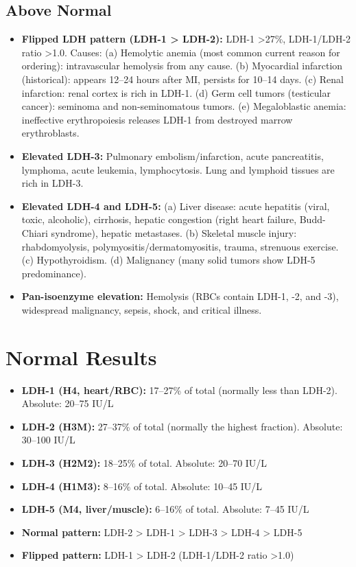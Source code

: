 \subsection*{Above Normal}
\begin{itemize}
  \item \textbf{Flipped LDH pattern (LDH-1 > LDH-2):} LDH-1 >27\%, LDH-1/LDH-2 ratio >1.0. Causes: (a) Hemolytic anemia (most common current reason for ordering): intravascular hemolysis from any cause. (b) Myocardial infarction (historical): appears 12--24 hours after MI, persists for 10--14 days. (c) Renal infarction: renal cortex is rich in LDH-1. (d) Germ cell tumors (testicular cancer): seminoma and non-seminomatous tumors. (e) Megaloblastic anemia: ineffective erythropoiesis releases LDH-1 from destroyed marrow erythroblasts.
  \item \textbf{Elevated LDH-3:} Pulmonary embolism/infarction, acute pancreatitis, lymphoma, acute leukemia, lymphocytosis. Lung and lymphoid tissues are rich in LDH-3.
  \item \textbf{Elevated LDH-4 and LDH-5:} (a) Liver disease: acute hepatitis (viral, toxic, alcoholic), cirrhosis, hepatic congestion (right heart failure, Budd-Chiari syndrome), hepatic metastases. (b) Skeletal muscle injury: rhabdomyolysis, polymyositis/dermatomyositis, trauma, strenuous exercise. (c) Hypothyroidism. (d) Malignancy (many solid tumors show LDH-5 predominance).
  \item \textbf{Pan-isoenzyme elevation:} Hemolysis (RBCs contain LDH-1, -2, and -3), widespread malignancy, sepsis, shock, and critical illness.
\end{itemize}

\section*{Normal Results}
\begin{itemize}
  \item \textbf{LDH-1 (H4, heart/RBC):} 17--27\% of total (normally less than LDH-2). Absolute: 20--75 IU/L \cite{wallach2022interpretation}
  \item \textbf{LDH-2 (H3M):} 27--37\% of total (normally the highest fraction). Absolute: 30--100 IU/L
  \item \textbf{LDH-3 (H2M2):} 18--25\% of total. Absolute: 20--70 IU/L
  \item \textbf{LDH-4 (H1M3):} 8--16\% of total. Absolute: 10--45 IU/L
  \item \textbf{LDH-5 (M4, liver/muscle):} 6--16\% of total. Absolute: 7--45 IU/L
  \item \textbf{Normal pattern:} LDH-2 > LDH-1 > LDH-3 > LDH-4 > LDH-5
  \item \textbf{Flipped pattern:} LDH-1 > LDH-2 (LDH-1/LDH-2 ratio >1.0)
\end{itemize}

